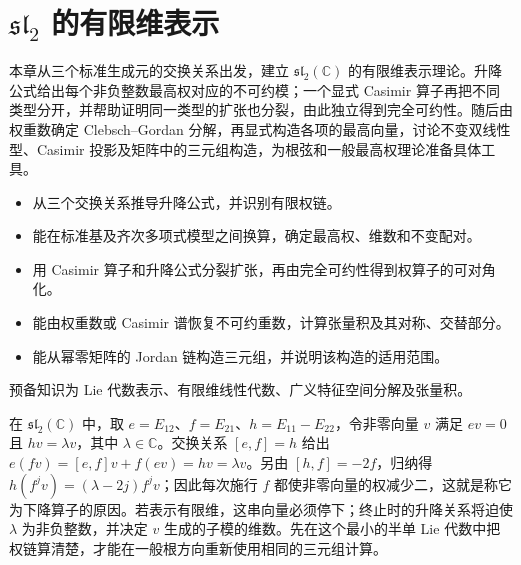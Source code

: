 
\chapter{\texorpdfstring{\(\mathfrak{sl}_2\)}{sl₂} 的有限维表示}
\label{b5:ch:14}

\begin{chapterabstract}
	本章从三个标准生成元的交换关系出发，建立 \(\mathfrak{sl}_2(\mathbb C)\) 的有限维表示理论。升降公式给出每个非负整数最高权对应的不可约模；一个显式 Casimir 算子再把不同类型分开，并帮助证明同一类型的扩张也分裂，由此独立得到完全可约性。随后由权重数确定 Clebsch--Gordan 分解，再显式构造各项的最高向量，讨论不变双线性型、Casimir 投影及矩阵中的三元组构造，为根弦和一般最高权理论准备具体工具。
\end{chapterabstract}

\begin{learninggoals}
	\begin{itemize}
		\item 从三个交换关系推导升降公式，并识别有限权链。
		\item 能在标准基及齐次多项式模型之间换算，确定最高权、维数和不变配对。
		\item 用 Casimir 算子和升降公式分裂扩张，再由完全可约性得到权算子的可对角化。
		\item 能由权重数或 Casimir 谱恢复不可约重数，计算张量积及其对称、交替部分。
		\item 能从幂零矩阵的 Jordan 链构造三元组，并说明该构造的适用范围。
	\end{itemize}
	预备知识为 Lie 代数表示、有限维线性代数、广义特征空间分解及张量积。
\end{learninggoals}

在 \(\mathfrak{sl}_2(\mathbb C)\) 中，取 \(e=E_{12}\)、\(f=E_{21}\)、\(h=E_{11}-E_{22}\)，令非零向量 \(v\) 满足 \(ev=0\) 且 \(hv=\lambda v\)，其中 \(\lambda\in\mathbb C\)。交换关系 \([e,f]=h\) 给出 \(e(fv)=[e,f]v+f(ev)=hv=\lambda v\)。另由 \([h,f]=-2f\)，归纳得 \(h(f^jv)=(\lambda-2j)f^jv\)；因此每次施行 \(f\) 都使非零向量的权减少二，这就是称它为下降算子的原因。若表示有限维，这串向量必须停下；终止时的升降关系将迫使 \(\lambda\) 为非负整数，并决定 \(v\) 生成的子模的维数。先在这个最小的半单 Lie 代数中把权链算清楚，才能在一般根方向重新使用相同的三元组计算。






